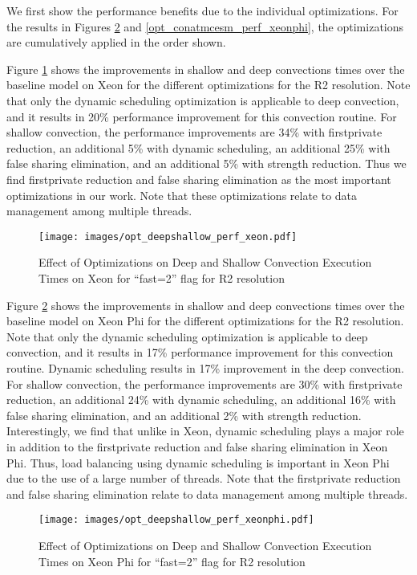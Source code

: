 We first show the performance benefits due to the individual optimizations.
For the results in Figures \ref{opt_deepshallow_perf_xeonphi} and \ref{opt_conatmcesm_perf_xeonphi}, the optimizations are cumulatively applied in the order shown.

 Figure \ref{opt_deepshallow_perf_xeon} shows the improvements in shallow and deep convections times over the baseline model on Xeon for the different optimizations for the R2 resolution. Note that only the dynamic scheduling optimization is applicable to deep convection, and it results in 20\% performance improvement for this convection routine. For shallow convection, the performance improvements are 34\% with firstprivate reduction, an additional 5\% with dynamic scheduling, an additional 25\% with false sharing elimination, and an additional 5\% with strength reduction. Thus we find firstprivate reduction and false sharing elimination as the most important optimizations in our work. Note that these optimizations relate to data management among multiple threads.

\begin {figure}
\centering
\texttt{[image: images/opt\_deepshallow\_perf\_xeon.pdf]}
\caption{Effect of Optimizations on Deep and Shallow Convection Execution Times on Xeon for ``fast=2'' flag for R2 resolution}
\label{opt_deepshallow_perf_xeon}
\end{figure}
%
Figure \ref{opt_deepshallow_perf_xeonphi} shows the improvements in shallow and deep convections times over the baseline model on Xeon Phi for the different optimizations for the R2 resolution. Note that only the dynamic scheduling optimization is applicable to deep convection, and it results in 17\% performance improvement for this convection routine.
 Dynamic scheduling results in 17\% improvement in the deep convection.
For shallow convection, the performance improvements are 30\% with firstprivate reduction, an additional 24\% with dynamic scheduling, an additional 16\% with false sharing elimination, and an additional 2\% with strength reduction.
Interestingly, we find that unlike in Xeon,
dynamic scheduling plays a major role in addition to the firstprivate reduction and false sharing elimination in Xeon Phi. Thus, load balancing using dynamic scheduling is important in Xeon Phi due to the use of a large number of threads. Note that the firstprivate reduction and false sharing elimination relate to data management among multiple threads.

\begin {figure}
\centering
\texttt{[image: images/opt\_deepshallow\_perf\_xeonphi.pdf]}
\caption{Effect of Optimizations on Deep and Shallow Convection Execution Times on Xeon Phi for ``fast=2'' flag for R2 resolution}
\label{opt_deepshallow_perf_xeonphi}
\end{figure}

